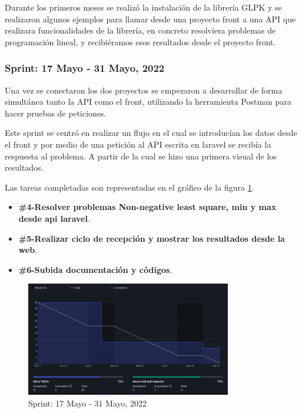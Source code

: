 Durante los primeros meses se realizó la instalación de la librería GLPK \cite{glpk:package} y se realizaron algunos ejemplos para llamar desde una proyecto front a una API que realizara funcionalidades de la librería, en concreto resolviera problemas de programación lineal, y recibiéramos esos resultados desde el proyecto front. 

\subsubsection{Sprint: 17 Mayo - 31 Mayo, 2022}

Una vez se conectaron los dos proyectos se empezaron a desarrollar de forma simultánea tanto la API como el front, utilizando la herramienta Postman para hacer pruebas de peticiones.

Este sprint se centró en realizar un flujo en el cual se introducían los datos desde el front y por medio de una petición al API escrita en laravel se recibía la respuesta al problema. A partir de la cual se hizo una primera visual de los resultados.

Las tareas completadas son representadas en el gráfico de la figura \ref{fig:sprint_17_31_may}.

\begin{itemize}
    \item \textbf{\#4-Resolver problemas Non-negative least square, min y max desde api laravel}.
    \item \textbf{\#5-Realizar ciclo de recepción y mostrar los resultados desde la web}.
    \item \textbf{\#6-Subida documentación y códigos}.
\end{itemize}

\begin{figure}[h!] 
\centering
    \includegraphics[width=0.8\textwidth]{img/sprint_17_31_may.PNG}
\caption{Sprint: 17 Mayo - 31 Mayo, 2022}
\label{fig:sprint_17_31_may}
\end{figure}

